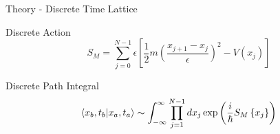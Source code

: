 \documentclass{beamer}
\begin{document}
\begin{frame}{Theory - Discrete Time Lattice}
{        \begin{block}{Discrete Action}
            \begin{equation}
                S_{M} = \sum^{N-1}_{j=0} \epsilon \left[\frac{1}{2}m\left(\frac{x_{j+1}-x_j}{\epsilon}\right)^2-V\left(x_j\right)\right]
            \end{equation}
        \end{block}
    }
    {
        
        \begin{block}{Discrete Path Integral}
            \begin{equation}
                \braket{x_b,t_b|x_a,t_a} \sim \int^{\infty}_{-\infty}\prod^{N-1}_{j=1}dx_{j} \exp{\left(\frac{i}{\hbar}S_{M}\left\{x_j\right\}\right)}
            \end{equation}
        \end{block}
    }
\end{frame}
\end{document}
